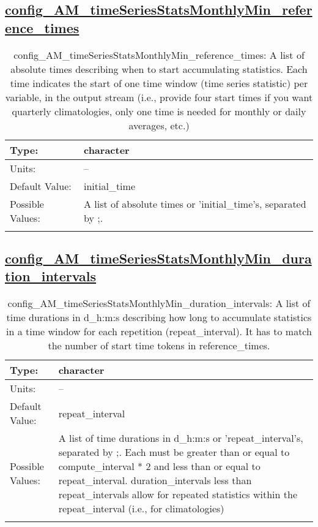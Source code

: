 \subsection[config\_AM\_timeSeriesStatsMonthlyMin\_reference\_times]{\hyperref[sec:nm_tab_AM_timeSeriesStatsMonthlyMin]{config\_AM\_timeSeriesStatsMonthlyMin\_reference\_times}}
\label{subsec:nm_sec_config_AM_timeSeriesStatsMonthlyMin_reference_times}
\begin{center}
\begin{longtable}{| p{2.0in} || p{4.0in} |}
    \hline
    Type: & character \\
    \hline
    Units: & -- \\
    \hline
    Default Value: & initial\_time \\
    \hline
    Possible Values: & A list of absolute times or 'initial\_time's, separated by ;. \\
    \hline
    \caption{config\_AM\_timeSeriesStatsMonthlyMin\_reference\_times: A list of absolute times describing when to start accumulating statistics. Each time indicates the start of one time window (time series statistic) per variable, in the output stream (i.e., provide four start times if you want quarterly climatologies, only one time is needed for monthly or daily averages, etc.)}
\end{longtable}
\end{center}
\subsection[config\_AM\_timeSeriesStatsMonthlyMin\_duration\_intervals]{\hyperref[sec:nm_tab_AM_timeSeriesStatsMonthlyMin]{config\_AM\_timeSeriesStatsMonthlyMin\_duration\_intervals}}
\label{subsec:nm_sec_config_AM_timeSeriesStatsMonthlyMin_duration_intervals}
\begin{center}
\begin{longtable}{| p{2.0in} || p{4.0in} |}
    \hline
    Type: & character \\
    \hline
    Units: & -- \\
    \hline
    Default Value: & repeat\_interval \\
    \hline
    Possible Values: & A list of time durations in d\_h:m:s or 'repeat\_interval's, separated by ;. Each must be greater than or equal to compute\_interval * 2 and less than or equal to repeat\_interval. duration\_intervals less than repeat\_intervals allow for repeated statistics within the repeat\_interval (i.e., for climatologies) \\
    \hline
    \caption{config\_AM\_timeSeriesStatsMonthlyMin\_duration\_intervals: A list of time durations in d\_h:m:s describing how long to accumulate statistics in a time window for each repetition (repeat\_interval). It has to match the number of start time tokens in reference\_times.}
\end{longtable}
\end{center}
